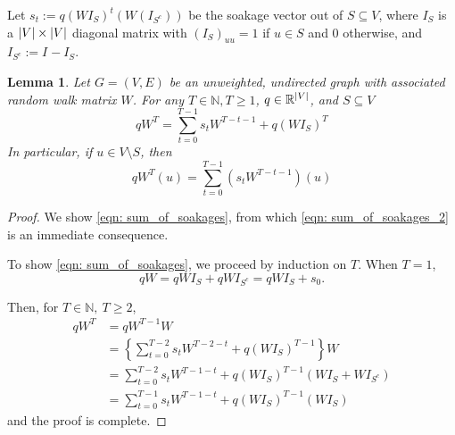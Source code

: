 \documentclass{article}
\DeclarePairedDelimiter\abs{\lvert}{\rvert}
\newcommand{\Reals}{\mathbb{R}}
\newcommand{\1}{\mathbf{1}}
\newcommand{\Wbf}{W}
\newcommand{\Ibf}[1]{I_{#1}}
\theoremstyle{aldenthm}
\newtheorem{lemma}{Lemma}
\theoremstyle{aldenrmrk}
\begin{document}
Let $s_t := q(\Wbf \Ibf{S})^t(\Wbf(\Ibf{S^c}))$ be the soakage vector out of $S \subseteq V$, where $\Ibf{S}$ is a $\abs{V} \times \abs{V}$ diagonal matrix with $(\Ibf{S})_{uu} = 1$ if $u \in S$ and 0 otherwise, and $\Ibf{S^c} := \Ibf{} - \Ibf{S}$. 
\begin{lemma}
	\label{lem: sum_of_soakages}
	Let $G = (V,E)$ be an unweighted, undirected graph with associated random walk matrix $\Wbf$. For any $T \in \mathbb{N}, T \geq 1$, $q \in \Reals^{\abs{V}}$, and $S \subseteq V$
	\begin{equation}
	\label{eqn: sum_of_soakages}
	q\Wbf^T = \sum_{t = 0}^{T - 1} s_t \Wbf^{T - t - 1} + q(\Wbf \Ibf{S})^T
	\end{equation}
	In particular, if $u \in V\setminus S$, then
	\begin{equation}
	\label{eqn: sum_of_soakages_2}
	q\Wbf^T(u) = \sum_{t = 0}^{T - 1} \left(s_t \Wbf^{T - t - 1}\right)(u)
	\end{equation}
\end{lemma}
\begin{proof}	
	We show \eqref{eqn: sum_of_soakages}, from which \eqref{eqn: sum_of_soakages_2} is an immediate consequence.
	
	
	To show \eqref{eqn: sum_of_soakages}, we proceed by induction on $T$. When $T = 1$,
	\begin{equation*}
	q\Wbf = q\Wbf\Ibf{S} + q\Wbf\Ibf{S^c} =  q\Wbf\Ibf{S} + s_0. 
	\end{equation*}
	
	Then, for $T \in \mathbb{N},~ T \geq 2$,
	\begin{align*}
	q\Wbf^{T} & = q\Wbf^{T - 1}{\Wbf} \\
	& = \left\{\sum_{t = 0}^{T - 2} s_t \Wbf^{T - 2 - t} + q(\Wbf \Ibf{S})^{T - 1} \right\} \Wbf \tag{by the inductive hypothesis}\\
	& = \sum_{t = 0}^{T - 2} s_t \Wbf^{T - 1 - t} + q(\Wbf \Ibf{S})^{T - 1} (\Wbf \Ibf{S} + \Wbf \Ibf{S^c}) \\
	& = \sum_{t = 0}^{T - 1} s_t \Wbf^{T - 1 - t} + q(\Wbf \Ibf{S})^{T - 1} (\Wbf \Ibf{S})
	\end{align*}
	and the proof is complete.
\end{proof}
\end{document}
